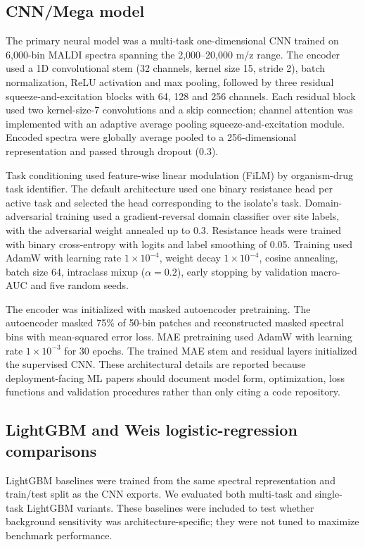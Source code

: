 \documentclass[11pt]{article}
\begin{document}
\subsection*{CNN/Mega model}

The primary neural model was a multi-task one-dimensional CNN trained on 6,000-bin MALDI spectra spanning the 2,000--20,000 m/z range. The encoder used a 1D convolutional stem (32 channels, kernel size 15, stride 2), batch normalization, ReLU activation and max pooling, followed by three residual squeeze-and-excitation blocks with 64, 128 and 256 channels. Each residual block used two kernel-size-7 convolutions and a skip connection; channel attention was implemented with an adaptive average pooling squeeze-and-excitation module. Encoded spectra were globally average pooled to a 256-dimensional representation and passed through dropout (0.3).

Task conditioning used feature-wise linear modulation (FiLM) by organism-drug task identifier. The default architecture used one binary resistance head per active task and selected the head corresponding to the isolate's task. Domain-adversarial training used a gradient-reversal domain classifier over site labels, with the adversarial weight annealed up to 0.3. Resistance heads were trained with binary cross-entropy with logits and label smoothing of 0.05. Training used AdamW with learning rate $1\times10^{-4}$, weight decay $1\times10^{-4}$, cosine annealing, batch size 64, intraclass mixup ($\alpha=0.2$), early stopping by validation macro-AUC and five random seeds.

The encoder was initialized with masked autoencoder pretraining. The autoencoder masked 75\% of 50-bin patches and reconstructed masked spectral bins with mean-squared error loss. MAE pretraining used AdamW with learning rate $1\times10^{-3}$ for 30 epochs. The trained MAE stem and residual layers initialized the supervised CNN. These architectural details are reported because deployment-facing ML papers should document model form, optimization, loss functions and validation procedures rather than only citing a code repository\cite{tripodAI2024,probast2019}.

\subsection*{LightGBM and Weis logistic-regression comparisons}

LightGBM baselines were trained from the same spectral representation and train/test split as the CNN exports. We evaluated both multi-task and single-task LightGBM variants. These baselines were included to test whether background sensitivity was architecture-specific; they were not tuned to maximize benchmark performance.
\end{document}

